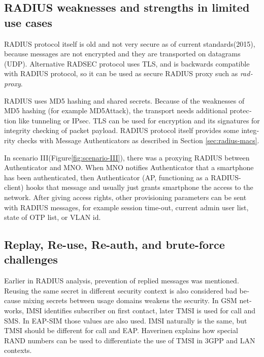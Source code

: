 \documentclass[12pt,a4paper,english]{tutthesis}
\begin{document}
\begin{otherlanguage}{english}
{\subsection{RADIUS weaknesses and strengths in limited use cases}
\label{sec-6-4-4}


RADIUS protocol itself is old and not very secure as of current
standards(2015), because messages are not encrypted and they are
transported on datagrams (UDP). Alternative RADSEC protocol uses TLS, and 
is backwards compatible with RADIUS protocol, so it can be used
as secure RADIUS proxy such as \emph{radproxy}\cite{uninett-radproxy}.

RADIUS uses MD5 hashing and shared secrets. Because of the weaknesses of
MD5 hashing (for example MD5Attack\cite{rfc5176}), the transport needs additional
protection like tunneling or IPsec. TLS can be used for encryption and
its signatures for integrity checking of packet payload.
RADIUS protocol itself provides some integrity checks with Message
Authenticators as described in Section \ref{sec:radius-macs}.



In scenario III(Figure\ref{fig:scenario-III}),  there was a proxying RADIUS between Authenticator
and MNO.  When MNO notifies Authenticator
that a smartphone has been authenticated, then Authenticator (AP, functioning
as a RADIUS-client) hooks that message and usually just grants
smartphone the access to the network. After giving access rights, other
provisioning parameters can be sent with RADIUS messages, for example
session time-out,
current admin user list, state of OTP list, or VLAN id.


\subsection{Replay, Re-use, Re-auth, and brute-force challenges}
\label{sec-6-4-5}

Earlier in RADIUS analysis, prevention of replied messages was
mentioned. Reusing the same secret in different security context is also
considered bad because mixing secrets between usage
domains weakens the security.  In GSM networks, IMSI identifies subscriber on
first contact, later TMSI is used for call and SMS.  In EAP-SIM those
values are also used. IMSI naturally is the same, but TMSI should be
different for call and EAP.  Haverinen\cite{hav-doc} explains how
special RAND numbers can be used to differentiate the use of TMSI in 3GPP and LAN
contexts.

}
\end{otherlanguage}
\end{document}
